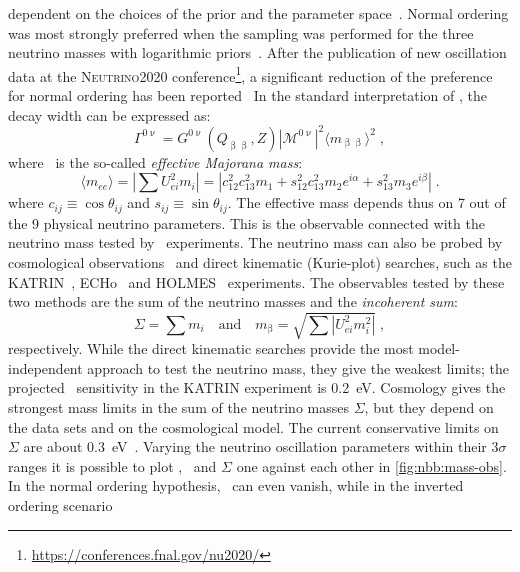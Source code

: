 dependent on the choices of the prior and the parameter space~\cite{Hannestad2016,
Schwetz2017}. Normal ordering was most strongly preferred when the sampling was performed
for the three neutrino masses with logarithmic priors~\cite{Gariazzo2018}. After the
publication of new oscillation data at the \textsc{Neutrino2020}
conference\footnote{\url{https://conferences.fnal.gov/nu2020/}}, a significant reduction
of the preference for normal ordering has been reported~\cite{Kelly2020, Esteban2020}
\newpar
In the standard interpretation of \onbb, the decay width can be expressed as:
\begin{equation}\label{eq:nbb:0nudecayrate}
  \Gamma^{0\upnu} = G^{0\upnu}(Q_{\upbeta\upbeta}, Z)
                  |\mathcal{M}^{0\upnu}|^2
                  \langle{m_{\upbeta\upbeta}}\rangle^2 \;,
\end{equation}
where \mbb\ is the so-called \emph{effective Majorana mass}:
\[
  \langle m_{ee} \rangle = \left| \sum U_{ei}^2 m_i \right|
                         = |c^2_{12} c^2_{13} m_1
                            + s^2_{12} c^2_{13} m_2 e^{i\alpha}
                            + s^2_{13} m_3 e^{i\beta}| \;.
\]
where $c_{ij} \equiv \cos{\theta_{ij}}$ and $s_{ij} \equiv \sin{\theta_{ij}}$.  The
effective mass depends thus on 7 out of the 9 physical neutrino parameters.  This is the
observable connected with the neutrino mass tested by \onbb\ experiments.  The neutrino
mass can also be probed by cosmological observations~\cite{Gerbino2018} and direct
kinematic (Kurie-plot) searches, such as the KATRIN~\cite{Aker2019},
ECHo~\cite{Gastaldo2018} and HOLMES~\cite{Alpert2014} experiments.  The observables tested
by these two methods are the sum of the neutrino masses and the \emph{incoherent sum}:
\[
  \Sigma = \sum m_i \quad \text{and} \quad m_{\upbeta}
         = \sqrt{\sum |U_{ei}^2 m_i^2|} \;,
\]
respectively. While the direct kinematic searches provide the most model-independent
approach to test the neutrino mass, they give the weakest limits; the projected \mb\
sensitivity in the KATRIN experiment is 0.2~eV.  Cosmology gives the strongest mass limits
in the sum of the neutrino masses $\Sigma$, but they depend on the data sets and on the
cosmological model. The current conservative limits on $\Sigma$ are about
0.3~eV~\cite{Aghanim2018}.
\newpar
Varying the neutrino oscillation parameters within their $3\sigma$ ranges it is possible
to plot \mbb, \mb\ and $\Sigma$ one against each other in \cref{fig:nbb:mass-obs}. In the
normal ordering hypothesis, \mbb\ can even vanish, while in the inverted ordering scenario
